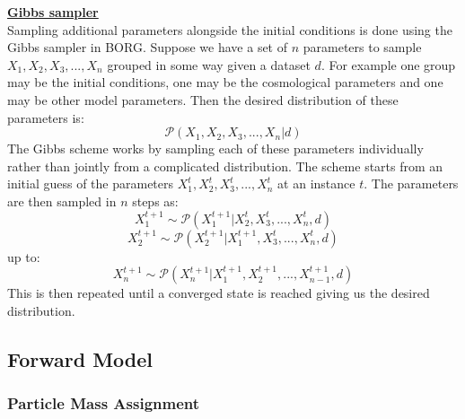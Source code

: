 \noindent \textbf{\underline{Gibbs sampler}} \\
Sampling additional parameters alongside the initial conditions is done using the Gibbs sampler in BORG. Suppose we have a set of $n$ parameters to sample 
${X_1, X_2, X_3, ..., X_n}$ grouped in some way given a dataset $d$. For example one group may be the initial conditions, one may be the cosmological parameters and one may be other model parameters. 
Then the desired distribution of these parameters is:
\begin{equation}
    \mathcal{P}(X_1, X_2, X_3, ..., X_n | d)
\end{equation}
The Gibbs scheme works by sampling each of these parameters individually rather than jointly from a complicated distribution. The scheme starts from an initial guess of the parameters 
${X_1^t, X_2^t, X_3^t, ..., X_n^t}$ at an instance $t$. The parameters are then sampled in $n$ steps as:
\begin{equation}
    X_1^{t+1} \sim \mathcal{P}(X_1^{t+1} | X_2^t, X_3^t, ..., X_n^t, d)
\end{equation}
\begin{equation}
    X_2^{t+1} \sim \mathcal{P}(X_2^{t+1} | X_1^{t+1}, X_3^t, ..., X_n^t, d)
\end{equation}
up to:
\begin{equation}
    X_n^{t+1} \sim \mathcal{P}(X_n^{t+1} | X_1^{t+1}, X_2^{t+1}, ..., X_{n-1}^{t+1}, d)
\end{equation}
This is then repeated until a converged state is reached giving us the desired distribution. \\

\subsection{Forward Model}
\subsubsection{Particle Mass Assignment} \label{sec:cic}


